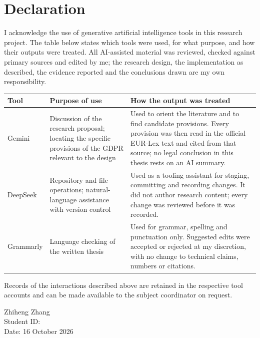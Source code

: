 %
\chapter*{Declaration}

I acknowledge the use of generative artificial intelligence tools in this research
project. The table below states which tools were used, for what purpose, and how
their outputs were treated. All AI-assisted material was reviewed, checked against
primary sources and edited by me; the research design, the implementation as
described, the evidence reported and the conclusions drawn are my own
responsibility.

\begin{table}[H]
\centering
\small
\setlength{\tabcolsep}{4pt}
\begin{tabular}{>{\raggedright\arraybackslash}p{}>{\raggedright\arraybackslash}p{}>{\raggedright\arraybackslash}p{}}
\toprule
Tool & Purpose of use & How the output was treated \\
\midrule
Gemini & Discussion of the research proposal; locating the specific provisions of the GDPR relevant to the design & Used to orient the literature and to find candidate provisions. Every provision was then read in the official EUR-Lex text and cited from that source; no legal conclusion in this thesis rests on an AI summary. \\
DeepSeek & Repository and file operations; natural-language assistance with version control & Used as a tooling assistant for staging, committing and recording changes. It did not author research content; every change was reviewed before it was recorded. \\
Grammarly & Language checking of the written thesis & Used for grammar, spelling and punctuation only. Suggested edits were accepted or rejected at my discretion, with no change to technical claims, numbers or citations. \\
\bottomrule
\end{tabular}
\end{table}

Records of the interactions described above are retained in the respective tool
accounts and can be made available to the subject coordinator on request.

\vspace{1em}
\noindent Zhiheng Zhang \\
\ifsubmissionedition Student ID: \PrivacyLensStudentID \\ \fi
Date: 16 October 2026
